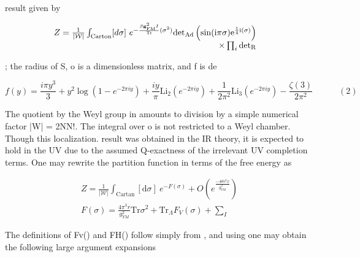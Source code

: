\documentclass{article}
\begin{document}
\sloppy

result given by


\begin{equation}
\begin{array} { r l } { Z = \frac { 1 } { | \mathcal { W } | } \int _ { \mathrm { C a r t o n } } [ d \sigma ] ~ e ^ { - \frac { \beta \mathbf { g } _ { \mathrm { F M } } ^ { 2 } I } { \mathrm { T r } } ( \sigma ^ { 2 } ) } \mathrm { d e t } _ { \mathrm { A d } } \left ( \sin ( \mathrm { i } \pi \sigma ) \mathrm { e } ^ { \frac { 1 } { 4 } \mathrm { i } ( \sigma ) } \right ) } & { } \\ { \times \prod _ { i } \mathrm { d e t } _ { \mathrm { R}}}\end{array}
\end{equation}


; the radius of S, o is a dimensionless matrix, and f is de


\begin{equation}
f ( y ) = { \frac { i \pi y ^ { 3 } } { 3 } } + y ^ { 2 } \log \left ( 1 - e ^ { - 2 \pi i y } \right ) + { \frac { i y } { \pi } } \mathrm { L i } _ { 2 } \left ( e ^ { - 2 \pi i y } \right ) + { \frac { 1 } { 2 \pi ^ { 2 } } } \mathrm { L i } _ { 3 } \left ( e ^ { - 2 \pi i y } \right ) - { \frac { \zeta ( 3 ) } { 2 \pi ^ { 2 } } } \qquad \quad ( 2 )
\end{equation}


The quotient by the Weyl group in amounts to division by a simple numerical factor |W| =
2NN!. The integral over o is not restricted to a Weyl chamber. Though this localization.
result was obtained in the IR theory, it is expected to hold in the UV due to the assumed
Q-exactness of the irrelevant UV completion terms. One may rewrite the partition function
in terms of the free energy as


\begin{equation}
\begin{array} { c } { Z = \frac { 1 } { | \mathcal { W } | } \int _ { \mathrm { C a r t a n } } [ \mathrm { d } \sigma ] ~ e ^ { - F ( \sigma ) } + O \left ( e ^ { \frac { - 4 \theta s ^ { 3 } x } { g _ { Y M } ^ { 2 } } } \right ) } \\ { F ( \sigma ) = \frac { 4 \pi ^ { 3 } r } { g _ { Y M } ^ { 2 } } \mathrm { T r } \sigma ^ { 2 } + \mathrm { T r } _ { \Lambda } F _ { V } ( \sigma ) + \sum _ { I } \mathrm {}}\end{array}
\end{equation}


The definitions of Fv() and FH() follow simply from , and using one may obtain the
following large argument expansions
\end{document}
